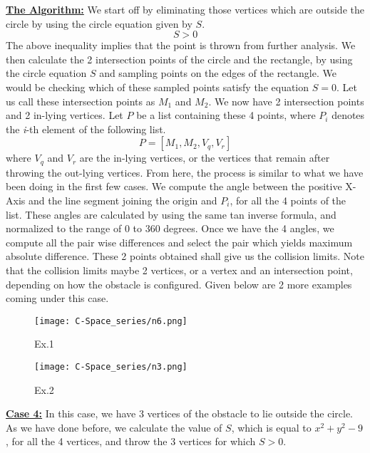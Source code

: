 \documentclass[12pt]{article}
\begin{document}
\newline
\underline{\textbf{The Algorithm:}}
\newline
We start off by eliminating those vertices which are outside the circle by using the circle equation given by $S$.
\newline
$$S>0$$The above inequality implies that the point is thrown from further analysis.
\newline
We then calculate the 2 intersection points of the circle and the rectangle, by using the circle equation $S$ and sampling points on the edges of the rectangle. We would be checking which of these sampled points satisfy the equation $S=$0. Let us call these intersection points as $M_1$ and $M_2$. We now have 2 intersection points and 2 in-lying vertices. Let $P$ be a list containing these 4 points, where $P_i$ denotes the \textit{i}-th
 element of the following list.
$$P=[M_1, M_2, V_q, V_r]$$
where $V_q$ and $V_r$ are the in-lying vertices, or the vertices that remain after throwing the out-lying vertices.
From here, the process is similar to what we have been doing in the first few cases. We compute the angle between the positive X-Axis and the line segment joining the origin and $P_i$, for all the 4 points of the list. These angles are calculated by using the same tan inverse formula, and normalized to the range of 0 to 360 degrees. Once we have the 4 angles, we compute all the pair wise differences and select the pair which yields maximum absolute difference. These 2 points obtained shall give us the collision limits. Note that the collision limits maybe 2 vertices, or a vertex and an intersection point, depending on how the obstacle is configured. Given below are 2 more examples coming under this case.
\begin{figure}[h!]
    \centering
    \begin{minipage}{0.44\textwidth}
        \centering
        \texttt{[image: C-Space\_series/n6.png]}
        \caption{Ex.1}
        \label{fig:n6}
    \end{minipage}
    \hfill
    \begin{minipage}{0.44\textwidth}
        \centering
        \texttt{[image: C-Space\_series/n3.png]}
        \caption{Ex.2}
        \label{fig:n3}
    \end{minipage}
\end{figure}
\newline
\underline{\textbf{Case 4:}}
\newline
In this case, we have 3 vertices of the obstacle to lie outside the circle. As we have done before, we calculate the value of $S$, which is equal to $x^2 + y^2 - 9$, for all the 4 vertices, and throw the 3 vertices for which $S>$0.
\end{document}
